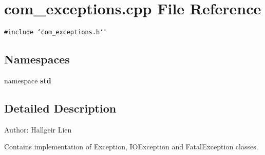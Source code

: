 \section{com\_\-exceptions.cpp File Reference}
\label{com__exceptions_8cpp}
{\tt \#include \char`\"{}com\_\-exceptions.h\char`\"{}}\par
\subsection*{Namespaces}
\begin{CompactItemize}
\item 
namespace \textbf{std}
\end{CompactItemize}


\subsection{Detailed Description}
\begin{Desc}
\item[Author:]Hallgeir Lien\end{Desc}
Contains implementation of Exception, IOException and FatalException classes. 